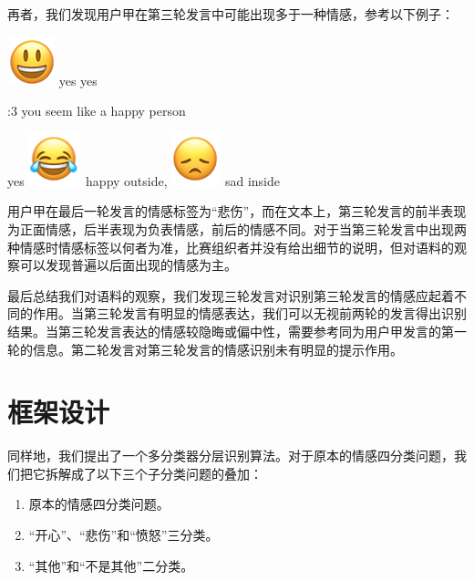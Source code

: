 再者，我们发现用户甲在第三轮发言中可能出现多于一种情感，参考以下例子：

 \includegraphics[height=1.5\fontcharht\font`\B]{img/emoji/laugh.png} yes yes \par
{} :3 you seem like a happy person \par
{} yes \includegraphics[height=1.5\fontcharht\font`\B]{img/emoji/lol.png} happy outside, \includegraphics[height=1.5\fontcharht\font`\B]{img/emoji/frown.png} sad inside \par

用户甲在最后一轮发言的情感标签为“悲伤”，而在文本上，第三轮发言的前半表现为正面情感，后半表现为负表情感，前后的情感不同。对于当第三轮发言中出现两种情感时情感标签以何者为准，比赛组织者并没有给出细节的说明，但对语料的观察可以发现普遍以后面出现的情感为主。

最后总结我们对语料的观察，我们发现三轮发言对识别第三轮发言的情感应起着不同的作用。当第三轮发言有明显的情感表达，我们可以无视前两轮的发言得出识别结果。当第三轮发言表达的情感较隐晦或偏中性，需要参考同为用户甲发言的第一轮的信息。第二轮发言对第三轮发言的情感识别未有明显的提示作用。

\section{框架设计}
\label{sec:exp_context_emo_framework}

同样地，我们提出了一个多分类器分层识别算法。对于原本的情感四分类问题，我们把它拆解成了以下三个子分类问题的叠加：

\begin{enumerate}

\item 原本的情感四分类问题。
\item “开心”、“悲伤”和“愤怒”三分类。
\item “其他”和“不是其他”二分类。

\end{enumerate}

